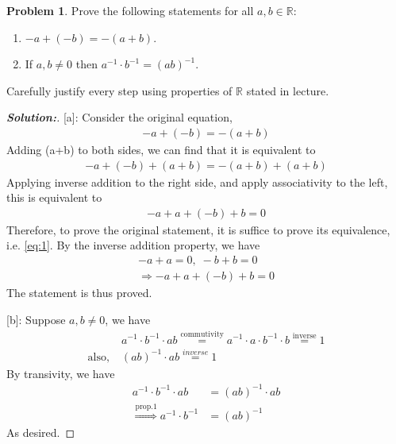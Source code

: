 \documentclass[12pt]{article}
\theoremstyle{definition}\newtheorem{problem}{Problem}
\newenvironment{solution}{\begin{proof}[\bfseries\textup{Solution:}]}{\end{proof}}
\begin{document}
\newpage
\begin{problem}
Prove the following statements for all $a,b\in\mathbb{R}$:
\begin{enumerate}
\item $-a + (-b) = -(a+b)$.
\item If $a,b\neq 0$ then $a^{-1}\cdot b^{-1} = (ab)^{-1}$.
\end{enumerate}
Carefully justify every step using properties of $\mathbb{R}$ stated in lecture.
\end{problem}

\begin{solution}
[a]:
Consider the original equation, \begin{align} 
    -a + (-b) = -(a+b) 
\end{align}
Adding (a+b) to both sides, we can find that it is equivalent to \begin{align} 
    -a +(-b) + (a+b) = -(a+b)+(a+b) 
\end{align}
Applying inverse addition to the right side, and apply associativity to the left, this is equivalent to 
\begin{align} \label{eq:1}
     -a +a +(-b) +b = 0
\end{align}
Therefore, to prove the original statement, it is suffice to prove its equivalence, i.e. \autoref{eq:1}.
By the inverse addition property, we have \begin{align} 
    -a + a = 0 , \; -b + b = 0 \\
    \Rightarrow -a + a + (-b) + b = 0
\end{align}
The statement is thus proved.

[b]:
Suppose $ a, b \neq 0 $, we have\begin{align} 
    &a^{-1} \cdot b^{-1} \cdot ab \stackrel{\text{commutivity}}{=} a^{-1} \cdot a \cdot b^{-1} \cdot b \stackrel{\text{inverse}}{=}1 \\
 \text{also,} \; &(ab)^{-1} \cdot ab \stackrel{inverse}{=} 1
\end{align}
By transivity, we have \begin{align} 
    a^{-1} \cdot b^{-1} \cdot ab &= (ab)^{-1} \cdot ab \\
    \stackrel{\text{prop.1}}{\Rightarrow} a^{-1} \cdot b^{-1} &= (ab)^{-1}
\end{align}
As desired.
\end{solution}
\end{document}
